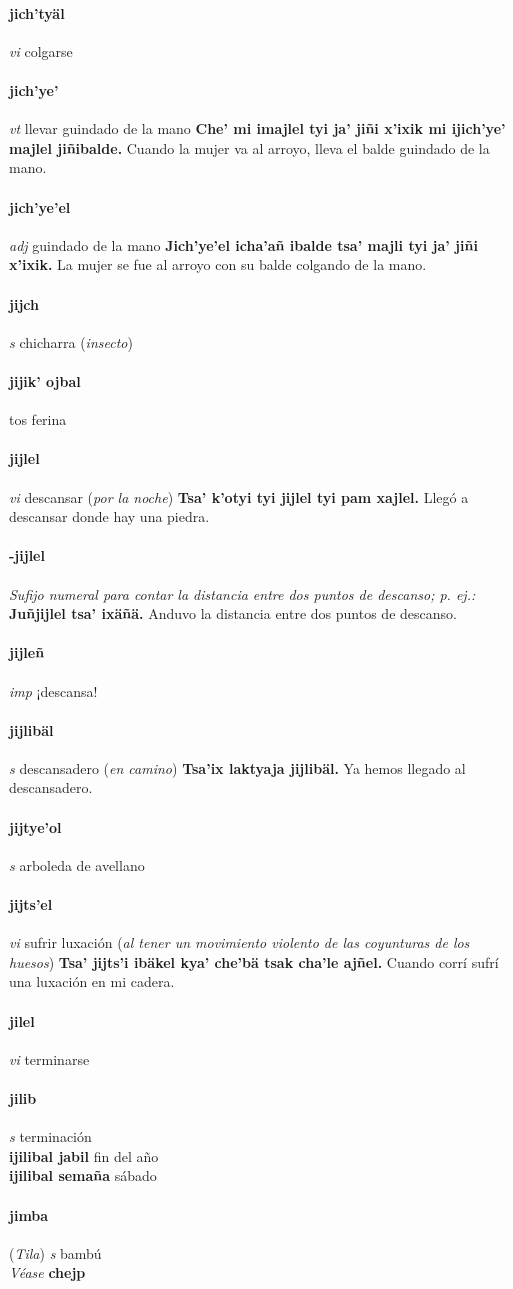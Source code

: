\documentclass{scrbook}
\newcommand{\entry}[1]{\paragraph{#1}}
\newcommand{\nontranslationdef}[1]{\textit{#1}}
\newcommand{\partofspeech}[1]{\textit{#1}}
\newcommand{\spanishtranslation}[1]{#1}
\newcommand{\clarification}[1]{(\textit{#1})}
\newcommand{\cholexample}[1]{\textbf{#1}}
\newcommand{\exampletranslation}[1]{#1}
\newcommand{\alsosee}[1]{\\\textit{Véase} \textbf{#1}}
\newcommand{\relevantdialect}[1]{(\textit{#1})}
\newcommand{\secondaryentry}[1]{\\\textbf{#1}}
\newcommand{\secondtranslation}[1]{#1}
\begin{document}
\begin{multicols}{2}
\entry{jich'tyäl}
\partofspeech{vi}
\spanishtranslation{colgarse}

\entry{jich'ye'}
\partofspeech{vt}
\spanishtranslation{llevar guindado de la mano}
\cholexample{Che' mi imajlel tyi ja' jiñi x'ixik mi ijich'ye' majlel jiñibalde.}
\exampletranslation{Cuando la mujer va al arroyo, lleva el balde guindado de la mano.}

\entry{jich'ye'el}
\partofspeech{adj}
\spanishtranslation{guindado de la mano}
\cholexample{Jich'ye'el icha'añ ibalde tsa' majli tyi ja' jiñi x'ixik.}
\exampletranslation{La mujer se fue al arroyo con su balde colgando de la mano.}

\entry{jijch}
\partofspeech{s}
\spanishtranslation{chicharra}
\clarification{insecto}

\entry{jijik' ojbal}
\spanishtranslation{tos ferina}

\entry{jijlel}
\partofspeech{vi}
\spanishtranslation{descansar}
\clarification{por la noche}
\cholexample{Tsa' k'otyi tyi jijlel tyi pam xajlel.}
\exampletranslation{Llegó a descansar donde hay una piedra.}

\entry{-jijlel}
\nontranslationdef{Sufijo numeral para contar la distancia entre dos puntos de descanso; p. ej.:}
\cholexample{Juñjijlel tsa' ixäñä.}
\exampletranslation{Anduvo la distancia entre dos puntos de descanso.}

\entry{jijleñ}
\partofspeech{imp}
\spanishtranslation{¡descansa!}

\entry{jijlibäl}
\partofspeech{s}
\spanishtranslation{descansadero}
\clarification{en camino}
\cholexample{Tsa'ix laktyaja jijlibäl.}
\exampletranslation{Ya hemos llegado al descansadero.}

\entry{jijtye'ol}
\partofspeech{s}
\spanishtranslation{arboleda de avellano}

\entry{jijts'el}
\partofspeech{vi}
\spanishtranslation{sufrir luxación}
\clarification{al tener un movimiento violento de las coyunturas de los huesos}
\cholexample{Tsa' jijts'i ibäkel kya' che'bä tsak cha'le ajñel.}
\exampletranslation{Cuando corrí sufrí una luxación en mi cadera.}

\entry{jilel}
\partofspeech{vi}
\spanishtranslation{terminarse}

\entry{jilib}
\partofspeech{s}
\spanishtranslation{terminación}
\secondaryentry{ijilibal jabil}
\secondtranslation{fin del año}
\secondaryentry{ijilibal semaña}
\secondtranslation{sábado}

\entry{jimba}
\relevantdialect{Tila}
\partofspeech{s}
\spanishtranslation{bambú}
\alsosee{chejp}


\end{multicols}
\end{document}
